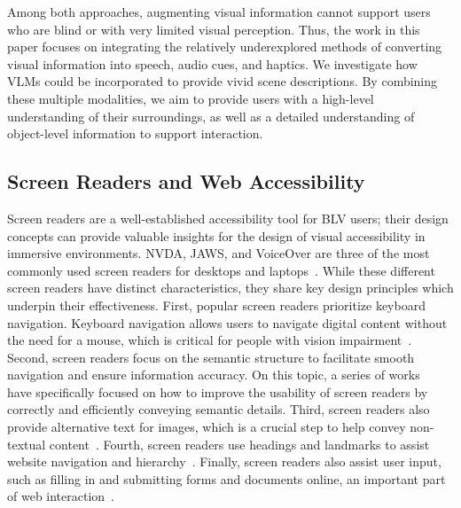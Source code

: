 Among both approaches, augmenting visual information cannot support users who are blind or with very limited visual perception. Thus, the work in this paper focuses on integrating the relatively underexplored methods of converting visual information into speech, audio cues, and haptics. We investigate how VLMs could be incorporated to provide vivid scene descriptions. By combining these multiple modalities, we aim to provide users with a high-level understanding of their surroundings, as well as a detailed understanding of object-level information to support interaction.


\subsection{Screen Readers and Web Accessibility}

Screen readers are a well-established accessibility tool for BLV users; %
their design concepts can provide valuable insights for the design of visual accessibility in immersive environments.
NVDA, JAWS, and VoiceOver are three of the most commonly used screen readers for desktops and laptops~\cite{WebAim-10}. While these different screen readers have distinct characteristics, they share key design principles which underpin their effectiveness. First, popular screen readers prioritize keyboard navigation. 
Keyboard navigation allows users to navigate digital content without the need for a mouse, which is critical for people with vision impairment~\cite{accessibleWebDev2021}. 
Second, screen readers focus on the semantic structure to facilitate smooth navigation and ensure information accuracy. On this topic, a series of works~\cite{zong2022rich, di2004usable, williams2019find} have specifically focused on how to improve the usability of screen readers by correctly and efficiently conveying semantic details. 
Third, screen readers also provide alternative text for images, which is a crucial step to help convey non-textual content~\cite{alttext2017, altText2018}. Fourth, screen readers use headings and landmarks to assist website navigation and hierarchy~\cite{southwell2013evaluation}. Finally, screen readers also assist user input, such as filling in and submitting forms and documents online, an important part of web interaction~\cite{borodin2010more}.

